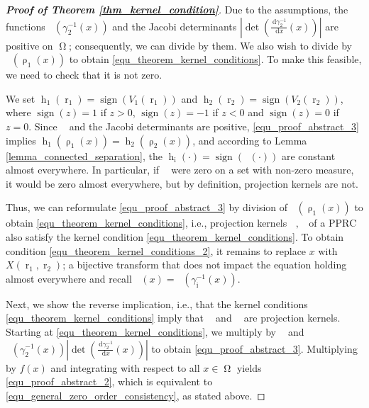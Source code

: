 \documentclass[12pt]{article}
\DeclareMathOperator{\projvariable}{i}
\DeclareMathOperator{\sign}{sign}
\newcommand{\dd}[1]{\,\mathrm{d}{#1}}
\DeclareMathOperator{\rayvariable}{r}
\DeclareMathOperator{\raygroundset}{R}
\DeclareMathOperator{\rayinverse}{\rho}
\DeclareMathOperator{\stripfkt}{h}
\DeclareMathOperator{\Vone}{V_1}
\DeclareMathOperator{\Vtwo}{V_2}
\DeclareMathOperator{\Vvariable}{{V_{\projvariable}}}
\newcommand{\conditionname}{$\mathrm{PPRC}$}
\DeclareMathOperator{\weightfkt}{\zeta}
\DeclareMathOperator{\altweightfkt}{\tilde {\zeta}}
\DeclareMathOperator{\rhotwo}{\weightfkt_{2}}
\DeclareMathOperator{\rhoi}{\weightfkt_{\projvariable}}
\DeclareMathOperator{\altrhoi}{\altweightfkt_{\projvariable}}
\DeclareMathOperator{\imgdom}{{\Omega}}
\begin{document}
\begin{proof}[\textbf{Proof of Theorem \ref{thm_kernel_condition}}]
Due to the assumptions, the functions $\rhotwo(\gamma_2^{-1}(x))$ and the Jacobi determinants $\left|\det\left(\frac{\dd {\gamma_{2}^{-1}} }{\dd x}(x) \right) \right|$ are positive on $\imgdom$; consequently, we can divide by them. We also wish to divide by $\Vone(\rayinverse_1(x))$ to obtain \eqref{equ_theorem_kernel_conditions}. 
To make this feasible, we need to check that it is not zero. 

We set $\stripfkt_1(\rayvariable_1)=\sign(V_1(\rayvariable_1))$ and $\stripfkt_2(\rayvariable_2)=\sign(V_2(\rayvariable_2))$, where $\sign(z)=1$ if $z>0$, $\sign(z)=-1$ if $z<0$ and $\sign(z)=0$ if $z=0$.
Since $\rhoi$ and the Jacobi determinants are positive, \eqref{equ_proof_abstract_3} implies $\stripfkt_1(\rayinverse_1(x))= \stripfkt_2(\rayinverse_2(x))$, and according to Lemma \ref{lemma_connected_separation}, the $\stripfkt_{\projvariable}(\cdot)=\sign(\Vvariable(\cdot))$ are constant almost everywhere. In particular, if $\Vone$ were zero on a set with non-zero measure, it would be zero almost everywhere, but by definition, projection kernels are not. 
 

Thus, we can reformulate \eqref{equ_proof_abstract_3} by division of $\Vone(\rayinverse_1(x))$ to obtain \eqref{equ_theorem_kernel_conditions}, i.e., projection kernels $\Vone,\Vtwo$ of a \conditionname{}  also satisfy the kernel condition \eqref{equ_theorem_kernel_conditions}.
 To obtain condition \eqref{equ_theorem_kernel_conditions_2}, it remains to replace $x$ with $X(\rayvariable_1,\rayvariable_2)$; a bijective transform that does not impact the equation holding almost everywhere and recall $\altrhoi(x)=\rhoi(\gamma_{\projvariable}^{-1}(x))$.

Next, we show the reverse implication, i.e., that the kernel conditions \eqref{equ_theorem_kernel_conditions} imply that $\Vone$ and $\Vtwo$ are projection kernels.
Starting at \eqref{equ_theorem_kernel_conditions}, we multiply by $\Vone$ and $\rhotwo(\gamma_2^{-1}(x)) |\det\left( \frac{ \dd \gamma_2^{-1}}{\dd x}(x)\right)|$ to obtain \eqref{equ_proof_abstract_3}. Multiplying by $f(x)$ and integrating with respect to all $x\in \imgdom$ yields \eqref{equ_proof_abstract_2}, which is equivalent to \eqref{equ_general_zero_order_consistency}, as stated above.



\end{proof}
\end{document}
